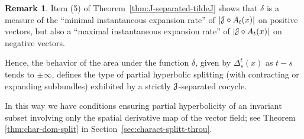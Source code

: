 \documentclass[12pt,reqno]{amsart}
\numberwithin{equation}{section}
\theoremstyle{plain}
\theoremstyle{definition}
\newtheorem{remark}[theorem]{Remark}
\newcommand{\J}{\EuScript{J}}
\begin{document}
\begin{remark}
  \label{rmk:Jexp-ineq}
  Item (5)  of
  Theorem~\ref{thm:J-separated-tildeJ}
  shows that $\delta$ is a measure of the ``minimal
  instantaneous expansion rate'' of $|\J\circ A_t(x)|$
  on positive vectors, but also
  a ``maximal instantaneous expansion
  rate'' of $|\J\circ A_t(x)|$ on negative vectors.%

  Hence, the behavior of the area under the function
  $\delta$, given by
  $\Delta_s^t(x)$ as $t-s$ tends
  to $\pm\infty$, defines the type of partial
  hyperbolic splitting (with contracting or expanding
  subbundles) exhibited by a strictly $\J$-separated
  cocycle.

  In this way we have conditions ensuring partial
  hyperbolicity of an invariant subset involving only the
  spatial derivative map of the vector field; see Theorem
  \ref{thm:char-dom-split} in
  Section~\ref{sec:charact-splitt-throu}.
\end{remark}
\end{document}
